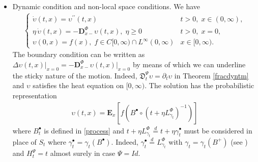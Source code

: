 \documentclass[11pt,a4paper]{article}
\theoremstyle{plain}
\theoremstyle{definition}
\theoremstyle{remark}
\begin{document}
\begin{itemize}
		\item[$\Psi=Id$)] Dynamic condition and non-local space conditions. We have
		\begin{align*}
			\begin{cases}
				\displaystyle 	\dot{\upsilon}(t,x)= \upsilon^{\prime \prime}(t,x) & t>0,\; x \in (0,\infty),\\
				\displaystyle 	\eta\, \dot{\upsilon}(t,x) = -\mathbf{D}_{x-}^\Phi \upsilon(t,x), \; \eta \geq 0   & t>0,\; x=0,\\
				\displaystyle 	\upsilon(0,x)=f(x), \; f \in C[0,\infty) \cap L^\infty(0, \infty)  &x\in [0, \infty).
			\end{cases}
		\end{align*}
		The boundary condition can be written as $\Delta \upsilon(t,x)\big\vert_{x=0}= -\mathbf{D}_{x-}^\Phi \upsilon(t,x) \big\vert_{x=0}$ by means of which we can underline the sticky nature of the motion.
		Indeed, $\mathfrak{D}_t^\Psi \upsilon= \partial_t \upsilon$ in Theorem \ref{fracdyntm} and $\upsilon$ satisfies the heat equation on $[0,\infty)$. The solution has the probabilistic representation
		\begin{align}
			\label{stickyBpallino}
			\upsilon(t,x)=\mathbf{E}_x\left[f(B^\bullet \circ (t+\eta L^\Phi_{\gamma_t})^{-1})\right]
		\end{align}
		where $B^\bullet_t$ is defined in \eqref{process} and $t+\eta L^\Phi_{\gamma_t} \stackrel{d}{=} t + \eta \gamma^\bullet_t$  must be considered in place of $S_t$ where $\gamma^\bullet_t = \gamma_t(B^\bullet)$. Indeed, $\gamma^\bullet_t \stackrel{d}{=} L^\Phi_{\gamma_t}$ with $\gamma_t= \gamma_t (B^+)$ (see \cite[Section 14]{ito1963brownian}) and $H^\Psi_t = t$ almost surely in case $\Psi=Id$. 
		
	\end{itemize}
	
\end{document}
